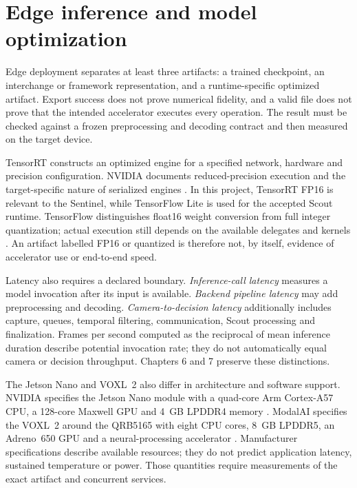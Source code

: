 \section{Edge inference and model optimization}
\label{sec:background:edge}

Edge deployment separates at least three artifacts: a trained checkpoint, an
interchange or framework representation, and a runtime-specific optimized
artifact. Export success does not prove numerical fidelity, and a valid file
does not prove that the intended accelerator executes every operation. The
result must be checked against a frozen preprocessing and decoding contract and
then measured on the target device.

TensorRT constructs an optimized engine for a specified network, hardware and
precision configuration. NVIDIA documents reduced-precision execution and the
target-specific nature of serialized engines \cite{NvidiaTensorRT861}. In this
project, TensorRT FP16 is relevant to the Sentinel, while TensorFlow Lite is
used for the accepted Scout runtime. TensorFlow distinguishes float16 weight
conversion from full integer quantization; actual execution still depends on
the available delegates and kernels \cite{TensorFlowPostTrainingQuantization}.
An artifact labelled FP16 or quantized is therefore not, by itself, evidence
of accelerator use or end-to-end speed.

Latency also requires a declared boundary. \emph{Inference-call latency}
measures a model invocation after its input is available. \emph{Backend
pipeline latency} may add preprocessing and decoding. \emph{Camera-to-decision
latency} additionally includes capture, queues, temporal filtering,
communication, Scout processing and finalization. Frames per second computed
as the reciprocal of mean inference duration describe potential invocation
rate; they do not automatically equal camera or decision throughput. Chapters
6 and 7 preserve these distinctions.

The Jetson Nano and VOXL~2 also differ in architecture and software support.
NVIDIA specifies the Jetson Nano module with a quad-core Arm Cortex-A57 CPU, a
128-core Maxwell GPU and 4~GB LPDDR4 memory \cite{NvidiaJetsonNano}. ModalAI
specifies the VOXL~2 around the QRB5165 with eight CPU cores, 8~GB LPDDR5, an
Adreno~650 GPU and a neural-processing accelerator \cite{ModalAIVOXL2}.
Manufacturer specifications describe available resources; they do not predict
application latency, sustained temperature or power. Those quantities require
measurements of the exact artifact and concurrent services.

